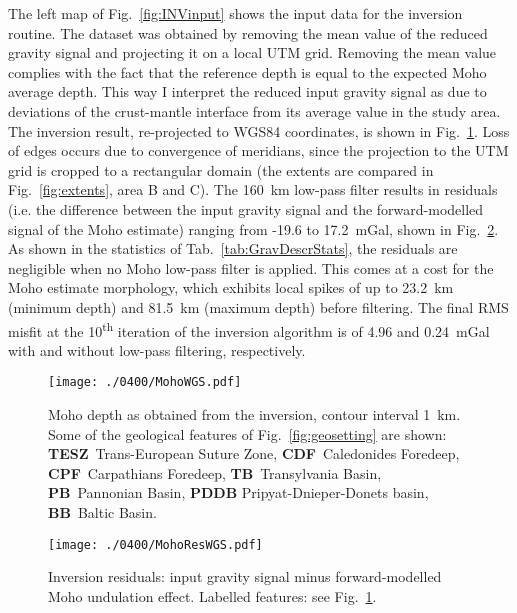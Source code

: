 The left map of Fig.~\ref{fig:INVinput} shows the input data for the inversion routine.
The dataset was obtained by removing the mean value of the reduced gravity signal and projecting it on a local UTM grid.
Removing the mean value complies with the fact that the reference depth is equal to the expected Moho average depth.
This way I interpret the reduced input gravity signal as due to deviations of the crust-mantle interface from its average value in the study area.
The inversion result, re-projected to WGS84 coordinates, is shown in Fig.~\ref{fig:INVMoho}.
Loss of edges occurs due to convergence of meridians, since the projection to the UTM grid is cropped to a rectangular domain (the extents are compared in Fig.~\ref{fig:extents}, area B and C).
The 160~\si{\kilo \metre} low-pass filter results in residuals (i.e. the difference between the input gravity signal and the forward-modelled signal of the Moho estimate) ranging from -19.6 to 17.2~mGal, shown in Fig.~\ref{fig:INVResMoho}.
As shown in the statistics of Tab.~\ref{tab:GravDescrStats}, the residuals are negligible when no Moho low-pass filter is applied.
This comes at a cost for the Moho estimate morphology, which exhibits local spikes of up to 23.2~\si{\kilo \metre} (minimum depth) and 81.5~\si{\kilo \metre} (maximum depth) before filtering.
The final RMS misfit at the 10\textsuperscript{th} iteration of the inversion algorithm is of 4.96 and 0.24~mGal with and without low-pass filtering, respectively.

\begin{figure}
	\begin{adjustbox}{center}
	\texttt{[image: ./0400/MohoWGS.pdf]}
	\end{adjustbox}
	\caption[Moho depth as obtained from the inversion.]{Moho depth as obtained from the inversion, contour interval 1~\si{\kilo \metre}. Some of the geological features of Fig.~\ref{fig:geosetting} are shown: \textbf{TESZ}~Trans-European Suture Zone, \textbf{CDF}~Caledonides Foredeep, \textbf{CPF}~Carpathians Foredeep, \textbf{TB}~Transylvania Basin, \textbf{PB}~Pannonian Basin, \textbf{PDDB} Pripyat-Dnieper-Donets basin, \textbf{BB}~Baltic Basin.}
	\label{fig:INVMoho}
\end{figure}

\begin{figure}
	\begin{adjustbox}{center}
	\texttt{[image: ./0400/MohoResWGS.pdf]}
	\end{adjustbox}
	\caption[Inversion residuals: input gravity signal minus forward-modelled Moho undulation effect.]{Inversion residuals: input gravity signal minus forward-modelled Moho undulation effect. Labelled features: see Fig.~\ref{fig:INVMoho}.}
	\label{fig:INVResMoho}
\end{figure}


